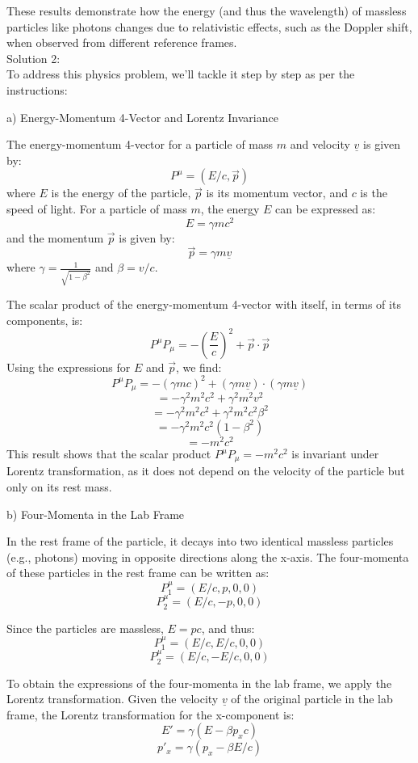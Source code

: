 \documentclass[a4paper,11pt]{article}
\begin{document}
These results demonstrate how the energy (and thus the wavelength) of massless particles like photons changes due to relativistic effects, such as the Doppler shift, when observed from different reference frames. \\

\noindent Solution 2: \\

To address this physics problem, we'll tackle it step by step as per the instructions:

a) Energy-Momentum 4-Vector and Lorentz Invariance

The energy-momentum 4-vector for a particle of mass \(m\) and velocity \(\underline{v}\) is given by:
\[ P^\mu = (E/c, \vec{p}) \]
where \(E\) is the energy of the particle, \(\vec{p}\) is its momentum vector, and \(c\) is the speed of light. For a particle of mass \(m\), the energy \(E\) can be expressed as:
\[ E = \gamma m c^2 \]
and the momentum \(\vec{p}\) is given by:
\[ \vec{p} = \gamma m \underline{v} \]
where \(\gamma = \frac{1}{\sqrt{1-\beta^2}}\) and \(\beta = v/c\).

The scalar product of the energy-momentum 4-vector with itself, in terms of its components, is:
\[ P^\mu P_\mu = -\left(\frac{E}{c}\right)^2 + \vec{p} \cdot \vec{p} \]
Using the expressions for \(E\) and \(\vec{p}\), we find:
\[ P^\mu P_\mu = -\left(\gamma m c\right)^2 + \left(\gamma m \underline{v}\right) \cdot \left(\gamma m \underline{v}\right) \]
\[ = -\gamma^2 m^2 c^2 + \gamma^2 m^2 v^2 \]
\[ = -\gamma^2 m^2 c^2 + \gamma^2 m^2 c^2 \beta^2 \]
\[ = -\gamma^2 m^2 c^2 (1 - \beta^2) \]
\[ = -m^2 c^2 \]
This result shows that the scalar product \(P^\mu P_\mu = -m^2 c^2\) is invariant under Lorentz transformation, as it does not depend on the velocity of the particle but only on its rest mass.

b) Four-Momenta in the Lab Frame

In the rest frame of the particle, it decays into two identical massless particles (e.g., photons) moving in opposite directions along the x-axis. The four-momenta of these particles in the rest frame can be written as:
\[ P_1^\mu = (E/c, p, 0, 0) \]
\[ P_2^\mu = (E/c, -p, 0, 0) \]

Since the particles are massless, \(E = pc\), and thus:
\[ P_1^\mu = (E/c, E/c, 0, 0) \]
\[ P_2^\mu = (E/c, -E/c, 0, 0) \]

To obtain the expressions of the four-momenta in the lab frame, we apply the Lorentz transformation. Given the velocity \(\underline{v}\) of the original particle in the lab frame, the Lorentz transformation for the x-component is:
\[ E' = \gamma (E - \beta p_x c) \]
\[ p'_x = \gamma (p_x - \beta E/c) \]
\end{document}
